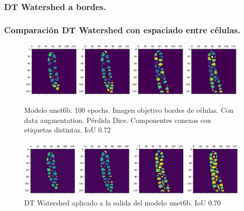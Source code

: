 \clearpage \subsubsection{DT Watershed a bordes.}


\clearpage \subsubsection{Comparación DT Watershed con espaciado entre células.}

\begin{figure}[ht]
\centering
\includegraphics[scale=0.5]{img/unet6t-color.png} 
\caption{Modelo unet6b. 100 epochs. Imagen objetivo bordes de células. Con data augmentation. Pérdida Dice. Componentes conexas con etiquetas distintas. IoU 0.72}\bigskip 
\includegraphics[scale=0.5]{img/unet6b-solocolor.png} 
\caption{DT Watershed aplicado a la salida del modelo unet6b. IoU 0.70}\bigskip 
\end{figure}
